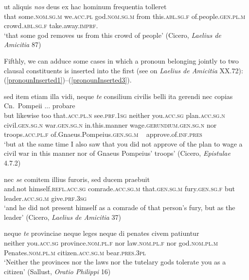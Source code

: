 \begin{exe}
\ex
\gll ut aliquis \emph{nos} deus ex hac hominum frequentia tolleret\\
that some.\textsc{nom.sg.m} we.\textsc{acc.pl} god.\textsc{nom.sg.m} from this.\textsc{abl.sg.f} of.people.\textsc{gen.pl.m} crowd.\textsc{abl.sg.f} take.away.\textsc{imprf.}\\
\trans `that some god removes us from this crowd of people' (Cicero, \textit{Laelius de Amicitia} 87)
\label{lessLinkedGroups6}
\end{exe}

Fifthly, we can adduce some cases in which a pronoun belonging jointly to two clausal constituents is inserted into the first (see \citealp{SeyffertMueller1876} on \textit{Laelius de Amicitia} XX.72): (\ref{pronounInserted1})--(\ref{pronounInserted3}).

\begin{exe}
\ex
\gll sed item etiam illa vidi, neque \emph{te} consilium civilis belli ita gerendi nec copias Cn.~Pompeii ... probare\\
but likewise too that.\textsc{acc.pl.n} see.\textsc{prf.1sg} neither you.\textsc{acc.sg} plan.\textsc{acc.sg.n} civil.\textsc{gen.sg.n} war.\textsc{gen.sg.n} in.this.manner wage.\textsc{gerundium.gen.sg.n} nor troops.\textsc{acc.pl.f} of.Gnaeus.Pompeius.\textsc{gen.sg.m} ~ approve.of.\textsc{inf.pres}\\
\trans `but at the same time I also saw that you did not approve of the plan to wage a civil war in this manner nor of Gnaeus Pompeius' troops' (Cicero, \textit{Epistulae} 4.7.2)
\label{pronounInserted1}
\end{exe}%

\begin{exe}
\ex
\gll nec \emph{se} comitem illius furoris, sed ducem praebuit\\
and.not himself.\textsc{refl.acc.sg} comrade.\textsc{acc.sg.m} that.\textsc{gen.sg.m} fury.\textsc{gen.sg.f} but leader.\textsc{acc.sg.m} give.\textsc{prf.3sg}\\
\trans `and he did not present himself as a comrade of that person's fury, but as the leader' (Cicero, \textit{Laelius de Amicitia} 37)
\label{pronounInserted2}
\end{exe}%

\begin{exe}
\ex
\gll neque \emph{te} provinciae neque leges neque di penates civem patiuntur\\
neither you.\textsc{acc.sg} province.\textsc{nom.pl.f} nor law.\textsc{nom.pl.f} nor god.\textsc{nom.pl.m} Penates.\textsc{nom.pl.m} citizen.\textsc{acc.sg.m} bear.\textsc{pres.3pl}\\
\trans `Neither the provinces nor the laws nor the tutelary gods tolerate you as a citizen' (Sallust, \textit{Oratio Philippi} 16)
\label{pronounInserted3}
\end{exe}

